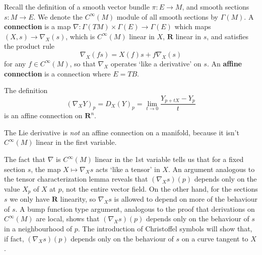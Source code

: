 Recall the definition of a smooth vector bundle $\pi: E \to M$, and smooth sections $s: M \to E$. We denote the $C^\infty(M)$ module of all smooth sections by $\Gamma(M)$. A {\bf connection} is a map $\nabla: \Gamma(TM) \times \Gamma(E) \to \Gamma(E)$ which maps $(X,s) \to \nabla_X(s)$, which is $C^\infty(M)$ linear in $X$, $\mathbf{R}$ linear in $s$, and satisfies the product rule
%
\[ \nabla_X(fs) = X(f)s + f\nabla_X(s) \]
%
for any $f \in C^\infty(M)$, so that $\nabla_X$ operates `like a derivative' on $s$. An {\bf affine connection} is a connection where $E = TB$.

\begin{example}
    The definition
    \[ (\nabla_X Y)_p = D_X(Y)_p = \lim_{t \to 0} \frac{Y_{p + tX} - Y_p}{t} \]
    is an affine connection on $\mathbf{R}^n$.
\end{example}

\begin{example}
    The Lie derivative is {\it not} an affine connection on a manifold, because it isn't $C^\infty(M)$ linear in the first variable.
\end{example}

The fact that $\nabla$ is $C^\infty(M)$ linear in the 1st variable tells us that for a fixed section $s$, the map $X \mapsto \nabla_X s$ acts `like a tensor' in $X$. An argument analogous to the tensor characterization lemma reveals that $(\nabla_X s)(p)$ depends only on the value $X_p$ of $X$ at $p$, not the entire vector field. On the other hand, for the sections $s$ we only have $\mathbf{R}$ linearity, so $\nabla_X s$ is allowed to depend on more of the behaviour of $s$. A bump function type argument, analogous to the proof that derivations on $C^\infty(M)$ are local, shows that $(\nabla_X s)(p)$ depends only on the behaviour of $s$ in a neighbourhood of $p$. The introduction of Christoffel symbols will show that, if fact, $(\nabla_X s)(p)$ depends only on the behaviour of $s$ on a curve tangent to $X$.

